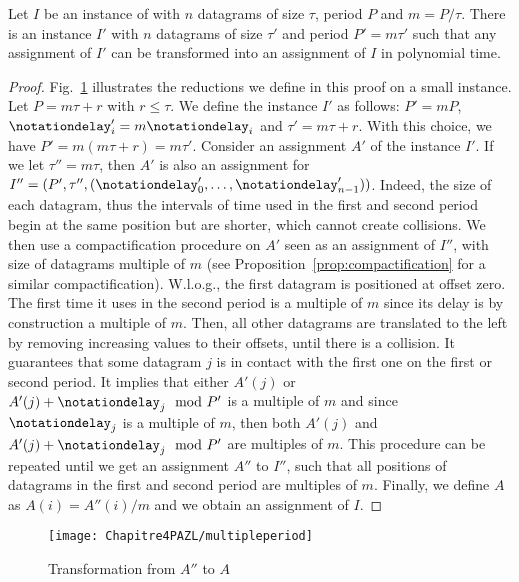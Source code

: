 \begin{lemma}\label{lemma:multiple}
Let $I$ be an instance of \pma with $n$ datagrams of size $\tau$, period $P$ and $m = P / \tau$. There is an instance $I'$ with $n$ datagrams of size $\tau'$ and period $P'= m\tau'$ such that any assignment of $I'$ can be transformed into an assignment of $I$ in polynomial time.
\end{lemma}
\begin{proof}
Fig.~\ref{fig:multipleperiod} illustrates the reductions we define in this proof on a small instance.
Let $P = m \tau + r$ with $r \leq \tau$. We define the instance $I'$ as follows: $P' = mP$, $\notationdelay_{i}' = m \notationdelay_i$ and $\tau' = m \tau + r$. With this choice, we have $P' = m(m \tau + r) = m \tau'$.
Consider an assignment $A'$ of the instance $I'$.
If we let $\tau'' = m\tau$, then $A'$ is also an assignment for $I'' = (P',\tau'',(\notationdelay_{0}',\dots,\notationdelay_{n-1}'))$. Indeed, the size of each datagram, thus the intervals of time used in the first and second period begin at the same position but are shorter, which cannot create collisions. We then use a compactification procedure on $A'$ seen as an assignment of $I''$,
with size of datagrams multiple of $m$ (see Proposition~\ref{prop:compactification} for a similar compactification). W.l.o.g., the first datagram is positioned at offset zero. The first time it uses in the second period is a multiple of $m$ since its delay is by construction a multiple of $m$. Then, all other datagrams are translated to the left by removing increasing values to their offsets, until there is a collision. It guarantees that some datagram $j$ is in contact with the first one on the first or second period. It implies that either $A'(j)$ or $A'(j)+\notationdelay_j \mod P'$ is a multiple of $m$ and since $\notationdelay_j$ is a multiple of $m$, then both $A'(j)$ and $A'(j)+\notationdelay_j \mod P'$ are multiples of $m$. This procedure can be repeated until we get an assignment $A''$ to $I''$, such that all positions of datagrams in the first and second period are multiples of $m$. Finally, we define $A$ as $A(i) = A''(i)/m$ and we obtain an assignment of $I$. 
\end{proof}

\begin{figure}
 \begin{center}
\texttt{[image: Chapitre4PAZL/multipleperiod]}
\end{center}
\caption{Transformation from $A''$ to $A$}
\label{fig:multipleperiod}
\end{figure}


